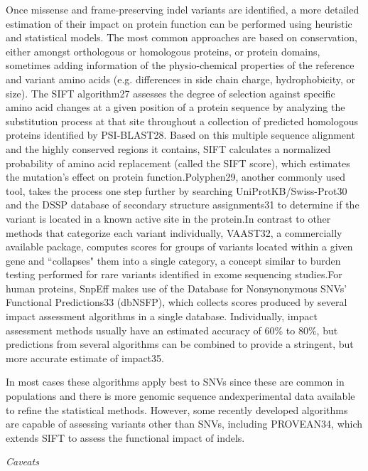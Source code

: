 Once missense and frame-preserving indel variants are identified, a more detailed estimation of their impact on protein function can be performed using heuristic and statistical models. The most common approaches are based on conservation, either amongst orthologous or homologous proteins, or protein domains, sometimes adding information of the physio-chemical properties of the reference and variant amino acids (e.g. differences in side chain charge, hydrophobicity, or size). The SIFT algorithm27 assesses the degree of selection against specific amino acid changes at a given position of a protein sequence by analyzing the substitution process at that site throughout a collection of predicted homologous proteins identified by PSI-BLAST28. Based on this multiple sequence alignment and the highly conserved regions it contains, SIFT calculates a normalized probability of amino acid replacement (called the SIFT score), which estimates the mutation’s effect on protein function.Polyphen29, another commonly used tool, takes the process one step further by searching UniProtKB/Swiss-Prot30 and the DSSP database of secondary structure assignments31 to determine if the variant is located in a known active site in the protein.In contrast to other methods that categorize each variant individually, VAAST32, a commercially available package, computes scores for groups of variants located within a given gene and ``collapses" them into a single category, a concept similar to burden testing performed for rare variants identified in exome sequencing studies.For human proteins, SnpEff makes use of the Database for Nonsynonymous SNVs’ Functional Predictions33 (dbNSFP), which collects scores produced by several impact assessment algorithms in a single database. Individually, impact assessment methods usually have an estimated accuracy of 60\% to 80\%, but predictions from several algorithms can be combined to provide a stringent, but more accurate estimate of impact35.

In most cases these algorithms apply best to SNVs since these are common in populations and there is more genomic sequence andexperimental data available to refine the statistical methods. However, some recently developed algorithms are capable of assessing variants other than SNVs, including PROVEAN34, which extends SIFT to assess the functional impact of indels.

	\textit{Caveats}
	
